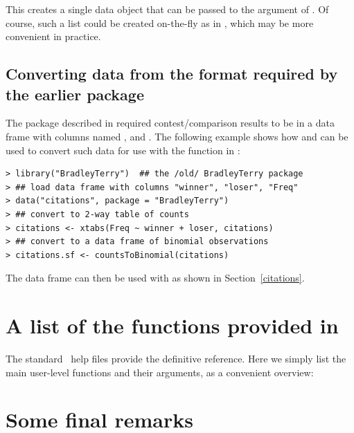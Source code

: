 \Rcodeplaceholder{}

This creates a single data object that can be passed to the 
argument of . Of course, such a list could be created on-the-fly as
in , which may be more convenient in
practice.

\subsection[Converting data from the format required by the earlier BradleyTerry package]{Converting data from the format required by the earlier  package}

The  package described in \citet{firt:05} required contest/comparison results to be in a data frame with columns named ,  and .  The following example shows how  and  can be used to convert such data for use with the  function in :
\begin{verbatim}
> library("BradleyTerry")  ## the /old/ BradleyTerry package
> ## load data frame with columns "winner", "loser", "Freq"
> data("citations", package = "BradleyTerry")
> ## convert to 2-way table of counts
> citations <- xtabs(Freq ~ winner + loser, citations)
> ## convert to a data frame of binomial observations
> citations.sf <- countsToBinomial(citations)
\end{verbatim}
The  data frame can then be used with  as shown in Section~\ref{citations}.



\section[A list of the functions provided in BradleyTerry2]{A list of the functions provided in }
\label{sec:functions}

The standard \R\ help files provide the definitive reference.  Here we simply
list the main user-level functions and their arguments, as a
convenient overview:

\Rcodeplaceholder{}


\section{Some final remarks}
\label{sec:finalremarks}


